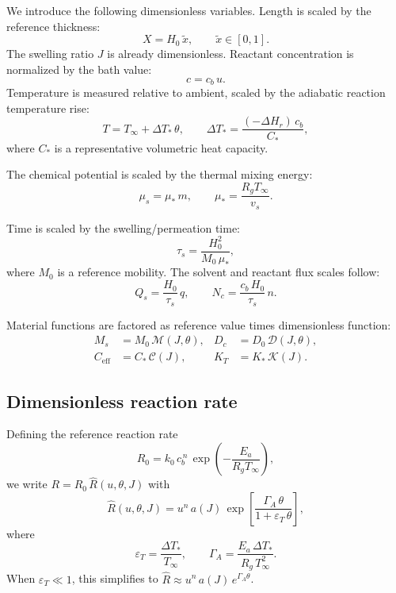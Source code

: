 \documentclass[aps,pre,reprint,superscriptaddress,longbibliography,floatfix]{revtex4-2}
\newcommand{\Ms}{\mathcal{M}}
\newcommand{\Ds}{\mathcal{D}}
\newcommand{\Cs}{\mathcal{C}}
\newcommand{\Ks}{\mathcal{K}}
\newcommand{\Rhat}{\widehat{R}}
\begin{document}
We introduce the following dimensionless variables. Length is scaled by the reference thickness:
\begin{equation}
  X = H_0\,\tilde{x}, \qquad \tilde{x}\in[0,1].
\end{equation}
The swelling ratio $J$ is already dimensionless. Reactant concentration is normalized by the bath value:
\begin{equation}
  c = c_b\,u.
\end{equation}
Temperature is measured relative to ambient, scaled by the adiabatic reaction temperature rise:
\begin{equation}
  T = T_\infty + \Delta T_*\,\theta,
  \qquad
  \Delta T_* = \frac{(-\Delta H_r)\,c_b}{C_*},
\end{equation}
where $C_*$ is a representative volumetric heat capacity.

The chemical potential is scaled by the thermal mixing energy:
\begin{equation}
  \mu_s = \mu_*\,m, \qquad \mu_* = \frac{R_g T_\infty}{v_s}.
\end{equation}

Time is scaled by the swelling/permeation time:
\begin{equation}
  \tau_s = \frac{H_0^2}{M_0\,\mu_*},
\end{equation}
where $M_0$ is a reference mobility. The solvent and reactant flux scales follow:
\begin{equation}
  Q_s = \frac{H_0}{\tau_s}\,q,
  \qquad
  N_c = \frac{c_b\,H_0}{\tau_s}\,n.
\end{equation}

Material functions are factored as reference value times dimensionless function:
\begin{align}
  M_s &= M_0\,\Ms(J,\theta), &
  D_c &= D_0\,\Ds(J,\theta), \\
  C_\mathrm{eff} &= C_*\,\Cs(J), &
  K_T &= K_*\,\Ks(J).
\end{align}

\subsection{Dimensionless reaction rate}

Defining the reference reaction rate
\begin{equation}
  R_0 = k_0\,c_b^{\,n}\,\exp\!\left(-\frac{E_a}{R_g T_\infty}\right),
\end{equation}
we write $R = R_0\,\Rhat(u,\theta,J)$ with
\begin{equation}
  \Rhat(u,\theta,J)
  = u^n\,a(J)\,
  \exp\!\left[\frac{\Gamma_A\,\theta}{1+\varepsilon_T\,\theta}\right],
  \label{eq:Rhat}
\end{equation}
where
\begin{equation}
  \varepsilon_T = \frac{\Delta T_*}{T_\infty},
  \qquad
  \Gamma_A = \frac{E_a\,\Delta T_*}{R_g\,T_\infty^2}.
  \label{eq:epsT_GammaA}
\end{equation}
When $\varepsilon_T \ll 1$, this simplifies to $\Rhat \approx u^n\,a(J)\,e^{\Gamma_A\theta}$.
\end{document}
